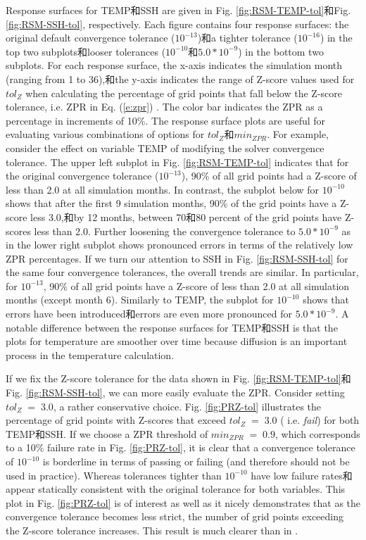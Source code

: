 Response surfaces for TEMP和SSH are given in Fig. \ref{fig:RSM-TEMP-tol}和Fig. \ref{fig:RSM-SSH-tol}, respectively.  Each figure contains four response surfaces: the original default convergence tolerance ($10^{-13}$)和a tighter tolerance ($10^{-16}$) in the top two subplots和looser tolerances ($10^{-10}$和$5.0*10^{-9}$) in the bottom two subplots.  For each response surface, the x-axis indicates the simulation month (ranging from 1 to 36),和the y-axis indicates the range of Z-score values used for $tol_{Z}$ when calculating the percentage of grid points that fall below the Z-score tolerance, i.e. ZPR in Eq. (\ref{e:zpr}) . The color bar indicates the ZPR as a percentage in increments of 10\%.  The response surface plots are useful for evaluating various combinations of options for $tol_{Z}$和$min_{ZPR}$. For example, consider the effect on variable TEMP of modifying the solver convergence tolerance.  The upper left subplot in Fig. \ref{fig:RSM-TEMP-tol} indicates that for the original convergence tolerance ($10^{-13}$),  90\% of all grid points had a Z-score of less than 2.0 at all simulation months.  In contrast, the subplot below for $10^{-10}$ shows that after the first 9 simulation months, 90\% of the grid points have a Z-score less 3.0,和by 12 months, between 70和80 percent of the grid points have Z-scores less than 2.0. Further loosening the convergence tolerance to $5.0*10^{-9}$ as in the lower right subplot shows pronounced errors in terms of the relatively low ZPR percentages.  If we turn our attention to SSH in Fig. \ref{fig:RSM-SSH-tol} for the same four convergence tolerances, the overall trends are similar.  In particular, for $10^{-13}$, 90\% of all grid points have a Z-score of less than 2.0 at all simulation months (except month 6).  Similarly to TEMP, the subplot for $10^{-10}$ shows that errors have been introduced和errors are even more pronounced for $5.0*10^{-9}$. A notable difference between the response surfaces for TEMP和SSH is that the plots for temperature are smoother over time because diffusion is an important process in the temperature calculation.

If we fix the Z-score tolerance for the data shown in Fig. \ref{fig:RSM-TEMP-tol}和Fig. \ref{fig:RSM-SSH-tol}, we can more easily evaluate the ZPR.
Consider setting $tol_{Z} \; = \; 3.0$, a rather conservative choice. Fig. \ref{fig:PRZ-tol} illustrates the percentage of grid points with Z-scores that exceed $tol_{Z} \; = \; 3.0$ ( i.e. \textit{fail}) for both TEMP和SSH. If we choose a ZPR threshold of $min_{ZPR} \; = \; 0.9$, which corresponds to a 10\% failure rate in Fig. \ref{fig:PRZ-tol}, it is clear that a convergence tolerance of $10^{-10}$ is borderline in terms of passing or failing (and therefore should not be used in practice).  Whereas tolerances tighter than $10^{-10}$ have low failure rates和appear statically consistent with the original tolerance for both variables.  This plot in Fig. \ref{fig:PRZ-tol} is of interest as well as it nicely demonstrates that as the convergence tolerance becomes less strict, the number of grid points exceeding the Z-score tolerance increases.  This result is much clearer than in \cite{yong2015}.

